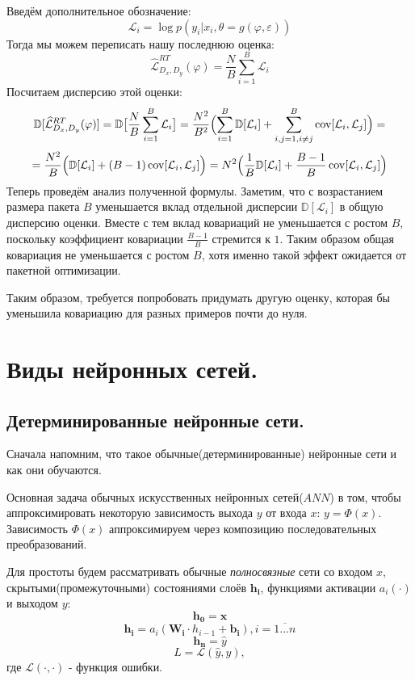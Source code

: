 Введём дополнительное обозначение:
$$\mathcal{L}_i = \log p(y_i | x_i, \theta=g(\varphi, \varepsilon))$$
Тогда мы можем переписать нашу последнюю оценка:
$$\widehat{\mathcal{L}}_{D_x, D_y}^{RT}(\varphi) = \frac{N}{B}\sum_{i=1}^B \mathcal{L}_i$$
Посчитаем дисперсию этой оценки:
$$\mathbb{D}[\widehat{\mathcal{L}}_{D_x, D_y}^{RT}(\varphi)] = \mathbb{D}\bigl[\frac{N}{B}\sum_{i=1}^B \mathcal{L}_i\bigr] = \frac{N^2}{B^2}\Bigl(\sum_{i=1}^B \mathbb{D}[\mathcal{L}_i] + \sum_{i,j=1, i\neq j}^B \operatorname*{cov}[\mathcal{L}_i, \mathcal{L}_j]\Bigr)=$$
$$=\frac{N^2}{B}\Bigl(\mathbb{D}[\mathcal{L}_i] + (B-1)\operatorname*{cov}[\mathcal{L}_i, \mathcal{L}_j]\Bigr)=N^2\Bigl(\frac{1}{B}\mathbb{D}[\mathcal{L}_i] + \frac{B-1}{B}\operatorname*{cov}[\mathcal{L}_i,\mathcal{L}_j]\Bigr)$$
Теперь проведём анализ полученной формулы. Заметим, что с возрастанием размера пакета $B$ уменьшается вклад отдельной дисперсии $\mathbb{D}[\mathcal{L}_i]$ в общую дисперсию оценки.
 Вместе с тем вклад ковариаций не уменьшается с ростом $B$, поскольку коэффициент ковариации $\frac{B - 1}{B}$ стремится к $1$. Таким образом общая ковариация
 не уменьшается с ростом $B$, хотя именно такой эффект ожидается от пакетной оптимизации.

Таким образом, требуется попробовать придумать другую оценку, которая бы уменьшила ковариацию для разных примеров почти до нуля.
\chapter{Виды нейронных сетей.}

\section{Детерминированные нейронные сети.}

Сначала напомним, что такое обычные(детерминированные) нейронные сети и как они обучаются.

Основная задача обычных искусственных нейронных сетей($ANN$) в том, чтобы аппроксимировать некоторую зависимость выхода $y$ от
 входа $x$: $y = \Phi(x)$. Зависимость $\Phi(x)$ аппроксимируем через композицию последовательных преобразований.

Для простоты будем рассматривать обычные \textit{полносвязные} сети со входом $x$,
 скрытыми(промежуточными) состояниями слоёв $\bm{h_i}$, функциями активации $a_i(\cdot)$ и выходом $y$:
$$\bm{h_0} = \bm{x}$$
$$\bm{h_i} = a_i(\bm{W_i} \cdot h_{i-1} + \bm{b_i}), i = \overline{1...n}$$
$$\bm{h_n} = \widehat{y}$$
$$L = \mathcal{L}(\widehat{y}, y),$$ где $\mathcal{L}(\cdot, \cdot)$ - функция ошибки.

